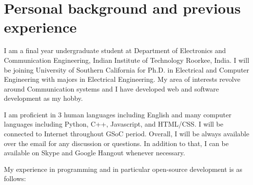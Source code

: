 \documentclass[a4paper, 11pt]{article}
\begin{document}
\section{Personal background and previous experience}
I am a final year undergraduate student at Department of Electronics and Communication Engineering, Indian Institute of Technology Roorkee, India. I will be joining University of Southern California for Ph.D. in Electrical and Computer Engineering with majors in Electrical Engineering. My area of interests revolve around Communication systems and I have developed web and software development as my hobby.

I am proficient in 3 human languages including English and  many computer languages including Python, C++, Javascript, and HTML/CSS. I will be connected to Internet throughout GSoC period. Overall, I will be always available over the email for any discussion or questions. In addition to that, I can be available on Skype and Google Hangout whenever necessary.



My experience in programming and in particular open-source development is as follows:
\end{document}
